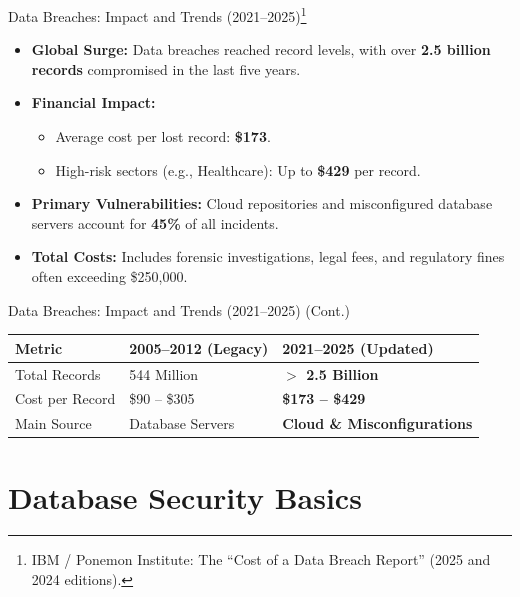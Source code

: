 \documentclass[aspectratio=169]{beamer}
\begin{document}
\begin{frame}{Data Breaches: Impact and Trends (2021--2025)\footnote{IBM / Ponemon Institute: The ``Cost of a Data Breach Report'' (2025 and 2024 editions).}}
    \begin{itemize}
        \item \textbf{Global Surge:} Data breaches reached record levels, with over \textbf{2.5 billion records} compromised in the last five years.
        \item \textbf{Financial Impact:}
        \begin{itemize}
            \item Average cost per lost record: \textbf{\$173}.
            \item High-risk sectors (e.g., Healthcare): Up to \textbf{\$429} per record.
        \end{itemize}
        \item \textbf{Primary Vulnerabilities:} Cloud repositories and misconfigured database servers account for \textbf{45\%} of all incidents.
        \item \textbf{Total Costs:} Includes forensic investigations, legal fees, and regulatory fines often exceeding \$250,000.
    \end{itemize}
\end{frame}

\begin{frame}{Data Breaches: Impact and Trends (2021--2025) (Cont.)}
    \centering
    \begin{tabular}{lll}
        \toprule
        \textbf{Metric} & \textbf{2005--2012 (Legacy)} & \textbf{2021--2025 (Updated)} \\
        \midrule
        Total Records & 544 Million & \textbf{$>$ 2.5 Billion} \\
        Cost per Record & \$90 -- \$305 & \textbf{\$173 -- \$429} \\
        Main Source & Database Servers & \textbf{Cloud \& Misconfigurations} \\
        \bottomrule
    \end{tabular}
\end{frame}

\section{Database Security Basics}
\end{document}
